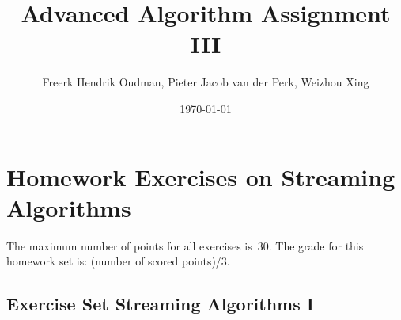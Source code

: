 \documentclass{article}
\title{Advanced Algorithm Assignment III}
\author{Freerk Hendrik Oudman, Pieter Jacob van der Perk, Weizhou Xing}
\date{\today}
\begin{document}
    \maketitle
    \section*{Homework Exercises on Streaming Algorithms}
    The maximum number of points for all exercises is~30.
    The grade for this homework set is: (number of scored points)/3.
    
    \newcommand{\setnr}{Str.I}
    \subsection*{Exercise Set Streaming Algorithms I}
\end{document}
